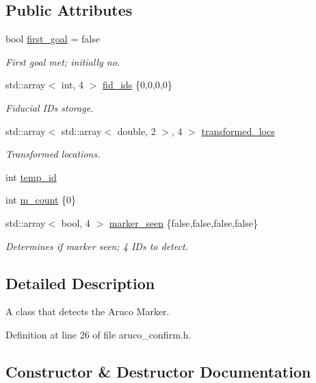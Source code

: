 \subsection*{Public Attributes}
\begin{DoxyCompactItemize}
\item 
bool \hyperlink{class_aruco_node_a323a2a97fc30a4e6daf59d9577485569}{first\+\_\+goal} = false
\begin{DoxyCompactList}\small\item\em First goal met; initially no. \end{DoxyCompactList}\item 
std\+::array$<$ int, 4 $>$ \hyperlink{class_aruco_node_aa64bc8aad47d7569e315f5045ecaa7ac}{fid\+\_\+ids} \{0,0,0,0\}
\begin{DoxyCompactList}\small\item\em Fiducial I\+Ds storage. \end{DoxyCompactList}\item 
std\+::array$<$ std\+::array$<$ double, 2 $>$, 4 $>$ \hyperlink{class_aruco_node_ab410bc0b655071ee67e7ba63b4edf256}{transformed\+\_\+locs}
\begin{DoxyCompactList}\small\item\em Transformed locations. \end{DoxyCompactList}\item 
int \hyperlink{class_aruco_node_ac9561321e855855ccc8f643cc139a638}{temp\+\_\+id}
\item 
int \hyperlink{class_aruco_node_a454cdb8d15fa07e7913887a1b2029600}{m\+\_\+count} \{0\}
\item 
std\+::array$<$ bool, 4 $>$ \hyperlink{class_aruco_node_a2e41167c119527f9fbeb937838fc8909}{marker\+\_\+seen} \{false,false,false,false\}
\begin{DoxyCompactList}\small\item\em Determines if marker seen; 4 I\+Ds to detect. \end{DoxyCompactList}\end{DoxyCompactItemize}


\subsection{Detailed Description}
A class that detects the Aruco Marker. 

Definition at line 26 of file aruco\+\_\+confirm.\+h.



\subsection{Constructor \& Destructor Documentation}
\mbox{\label{class_aruco_node_af8a93117bb0cf5f43bc10d3f0c2e9777}} 

